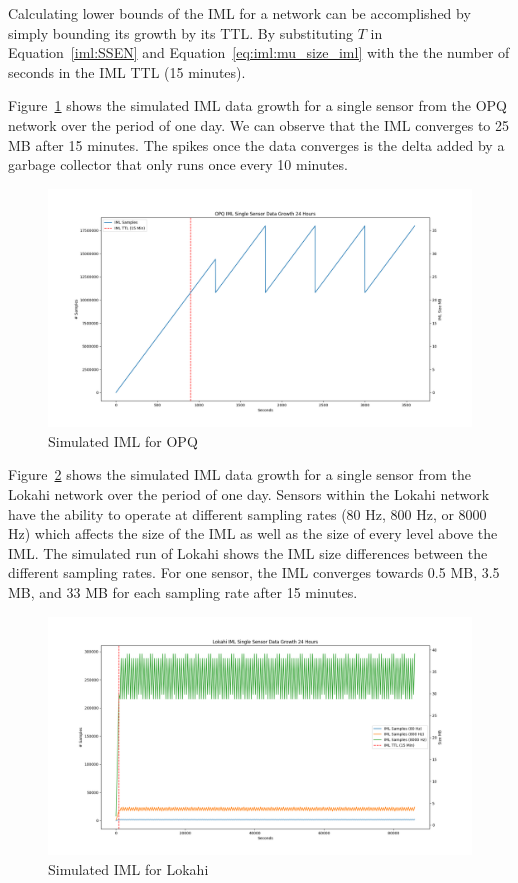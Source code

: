 Calculating lower bounds of the IML for a network can be accomplished by simply bounding its growth by its TTL\@. By substituting $T$ in Equation~\ref{iml:SSEN} and Equation~\ref{eq:iml:mu_size_iml} with the the number of seconds in the IML TTL (15 minutes).

Figure~\ref{fig:sim_iml_opq} shows the simulated IML data growth for a single sensor from the OPQ network over the period of one day. We can observe that the IML converges to 25 MB after 15 minutes. The spikes once the data converges is the delta added by a garbage collector that only runs once every 10 minutes.

\begin{figure}[H]
	\centering
	\includegraphics[width=\linewidth]{figures/sim_iml_opq.png}
	\caption{Simulated IML for OPQ}
	\label{fig:sim_iml_opq}
\end{figure}

Figure~\ref{fig:sim_iml_lokahi} shows the simulated IML data growth for a single sensor from the Lokahi network over the period of one day. Sensors within the Lokahi network have the ability to operate at different sampling rates (80 Hz, 800 Hz, or 8000 Hz) which affects the size of the IML as well as the size of every level above the IML. The simulated run of Lokahi shows the IML size differences between the different sampling rates. For one sensor, the IML converges towards 0.5 MB, 3.5 MB, and 33 MB for each sampling rate after 15 minutes.

\begin{figure}[H]
	\centering
	\includegraphics[width=\linewidth]{figures/sim_iml_lokahi.png}
	\caption{Simulated IML for Lokahi}
	\label{fig:sim_iml_lokahi}
\end{figure}

